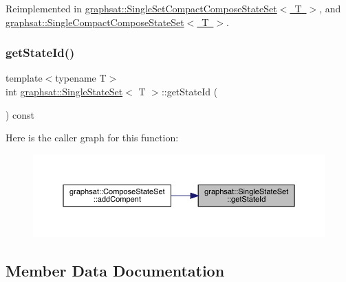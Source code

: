 Reimplemented in \mbox{\hyperlink{classgraphsat_1_1_single_set_compact_compose_state_set_a0ef077413f338e00cd1420a0edc439fa}{graphsat\+::\+Single\+Set\+Compact\+Compose\+State\+Set$<$ T $>$}}, and \mbox{\hyperlink{classgraphsat_1_1_single_compact_compose_state_set_ac42bca39e3e7a2eabaacba1e978b11ef}{graphsat\+::\+Single\+Compact\+Compose\+State\+Set$<$ T $>$}}.

\mbox{\label{classgraphsat_1_1_single_state_set_a98258d528f6b1111de952c5d4d4ab6ee}} 
\subsubsection{\texorpdfstring{getStateId()}{getStateId()}}
{\footnotesize\ttfamily template$<$typename T$>$ \\
int \mbox{\hyperlink{classgraphsat_1_1_single_state_set}{graphsat\+::\+Single\+State\+Set}}$<$ T $>$\+::get\+State\+Id (\begin{DoxyParamCaption}{ }\end{DoxyParamCaption}) const\hspace{0.3cm}{\ttfamily [inline]}}

Here is the caller graph for this function\+:\nopagebreak
\begin{figure}[H]
\begin{center}
\leavevmode
\includegraphics[width=350pt]{classgraphsat_1_1_single_state_set_a98258d528f6b1111de952c5d4d4ab6ee_icgraph}
\end{center}
\end{figure}


\subsection{Member Data Documentation}
\mbox{\label{classgraphsat_1_1_single_state_set_a9334c3f0f7db1854fcb6c2b111955901}} 

